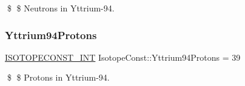 \$ \$ Neutrons in Yttrium-\/94. \mbox{\label{group___isotope_const-_yttrium-_y94_gadc23bdcb794fc403f4d53168a8a958ab}} 
\subsubsection{\texorpdfstring{Yttrium94\+Protons}{Yttrium94Protons}}
{\footnotesize\ttfamily \mbox{\hyperlink{group___isotope_const-_macros_ga5f18360b3e99483a35c32d789e62621c}{I\+S\+O\+T\+O\+P\+E\+C\+O\+N\+S\+T\+\_\+\+I\+NT}} Isotope\+Const\+::\+Yttrium94\+Protons = 39}

\$ \$ Protons in Yttrium-\/94. 